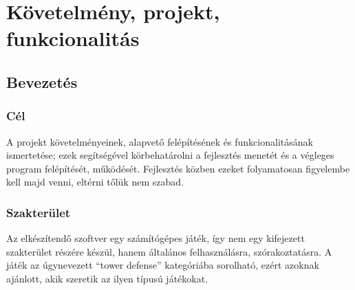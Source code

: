 %

\newcommand{\define}[2]{\textbf{#1}\hspace{3mm}#2\medskip\newline}

\chapter{Követelmény, projekt, funkcionalitás}

\thispagestyle{fancy}

\section{Bevezetés}

\subsection{Cél}
A projekt követelményeinek, alapvető felépítésének és funkcionalitásának ismertetése; ezek segítségével körbehatárolni a fejlesztés menetét és a végleges program felépítését, működését. Fejlesztés közben ezeket folyamatosan figyelembe kell majd venni, eltérni tőlük nem szabad.

\subsection{Szakterület}
Az elkészítendő szoftver egy számítógépes játék, így nem egy kifejezett szakterület részére készül, hanem általános felhasználásra, szórakoztatásra. A játék az úgynevezett ``tower defense'' kategóriába sorolható, ezért azoknak ajánlott, akik szeretik az ilyen típusú játékokat.

